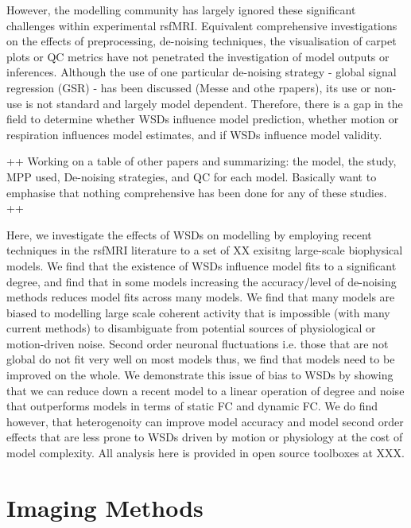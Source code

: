 \documentclass[oneside]{zHenriquesLab-StyleBioRxiv}
\begin{document}
However, the modelling community has largely ignored these significant challenges within experimental rsfMRI. Equivalent comprehensive investigations on the effects of preprocessing, de-noising techniques, the visualisation of carpet plots or QC metrics have not penetrated the investigation of model outputs or inferences. Although the use of one particular de-noising strategy - global signal regression (GSR) - has been discussed (Messe and othe rpapers), its use or non-use is not standard and largely model dependent. Therefore, there is a gap in the field to determine whether WSDs influence model prediction, whether motion or respiration influences model estimates, and if WSDs influence model validity. 


++ Working on a table of other papers and summarizing: the model, the study, MPP used, De-noising strategies, and QC for each model. Basically want to emphasise that nothing comprehensive has been done for any of these studies. ++


Here, we investigate the effects of WSDs on modelling by employing recent techniques in the rsfMRI literature to a set of XX exisitng large-scale biophysical models. We find that the existence of WSDs influence model fits to a significant degree, and find that in some models increasing the accuracy/level of de-noising methods reduces model fits across many models. We find that many models are biased to modelling large scale coherent activity that is impossible (with many current methods) to disambiguate from potential sources of physiological or motion-driven noise. Second order neuronal fluctuations i.e. those that are not global do not fit very well on most models thus, we find that models need to be improved on the whole. We demonstrate this issue of bias to WSDs by showing that we can reduce down a recent model to a linear operation of degree and noise that outperforms models in terms of static FC and dynamic FC. We do find however, that heterogenoity can improve model accuracy and model second order effects that are less prone to WSDs driven by motion or physiology at the cost of model complexity. All analysis here is provided in open source toolboxes at XXX.


\section*{Imaging Methods}
\end{document}
